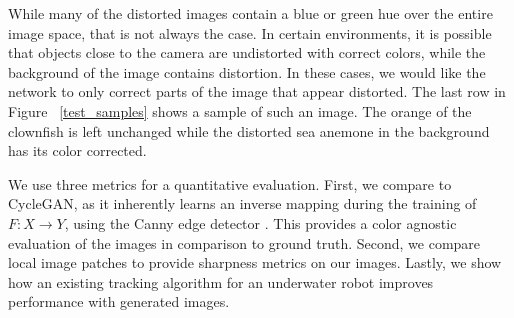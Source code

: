\documentclass[letterpaper, 10pt, conference]{ieeeconf}
\begin{document}
While many of the distorted images contain a blue or green hue over the entire image space, that is not always the case.
In certain environments,
it is possible that objects close to the camera are undistorted with correct colors, while the background
of the image contains distortion. In these cases, we would like the network to only correct parts of the image that
appear distorted. The last row in Figure ~\ref{test_samples} shows a sample of such an image. The orange of the clownfish is left
unchanged while the distorted sea anemone in the background has its color corrected.

We use three metrics for a quantitative evaluation. First, we compare to CycleGAN, as it inherently learns an inverse
mapping during the training of $F: X \rightarrow Y$, using the Canny edge detector
\cite{canny1986computational}. This provides a color agnostic evaluation of the images in comparison to ground truth.
Second, we compare local image patches to provide sharpness metrics on our images. Lastly, we show how an existing
tracking algorithm for an underwater robot improves performance with generated images.
\end{document}
